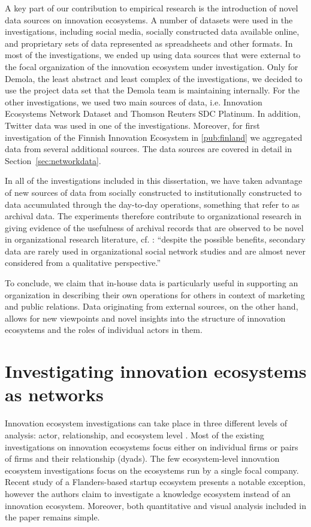 A key part of our contribution to empirical research is the introduction of novel data sources on innovation ecosystems. A number of datasets were used in the investigations, including social media, socially constructed data available online, and proprietary sets of data represented as spreadsheets and other formats. In most of the investigations, we ended up using data sources that were external to the focal organization of the innovation ecosystem under investigation. Only for Demola, the least abstract and least complex of the investigations, we decided to use the project data set that the Demola team is maintaining internally. For the other investigations, we used two main sources of data, i.e. Innovation Ecosystems Network Dataset and Thomson Reuters SDC Platinum. In addition, Twitter data was used in one of the investigations. Moreover, for first investigation of the Finnish Innovation Ecosystem in \ref{pub:finland} we aggregated data from several additional sources. The data sources are covered in detail in Section~\ref{sec:networkdata}.

In all of the investigations included in this dissertation, we have taken advantage of new sources of data from socially constructed to institutionally constructed to data accumulated through the day-to-day operations, something that \cite{Williams2015MixedAnalysis} refer to as archival data. The experiments therefore contribute to organizational research in giving evidence of the usefulness of archival records that are observed to be novel in organizational research literature, cf. \cite{Williams2015MixedAnalysis}: ``despite the possible benefits, secondary data are rarely used in organizational social network studies and are almost never considered from a qualitative perspective.'' 

To conclude, we claim that in-house data is particularly useful in supporting an organization in describing their own operations for others in context of marketing and public relations. Data originating from external sources, on the other hand, allows for new viewpoints and novel insights into the structure of innovation ecosystems and the roles of individual actors in them.

\section{Investigating innovation ecosystems as networks}

Innovation ecosystem investigations can take place in three different levels of analysis: actor, relationship, and ecosystem level \citep{Jarvi2016TakingReview}. Most of the existing investigations on innovation ecosystems focus either on individual firms or pairs of firms and their relationship (dyads). The few ecosystem-level innovation ecosystem investigations focus on the ecosystems run by a single focal company. Recent study of a Flanders-based startup ecosystem \citep{Clarysse2014CreatingEcosystems} presents a notable exception, however the authors claim to investigate a knowledge ecosystem instead of an innovation ecosystem. Moreover, both quantitative and visual analysis included in the paper remains simple.

